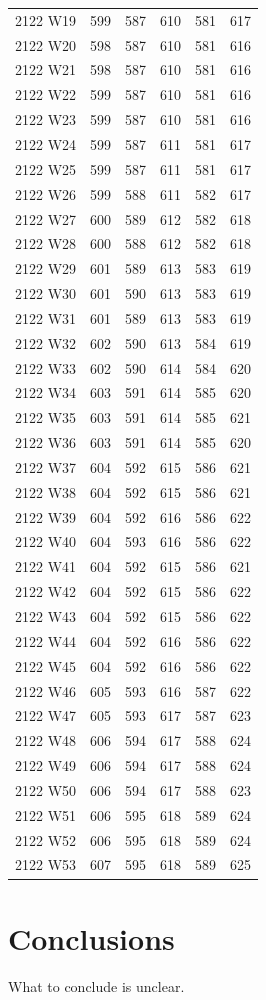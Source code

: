 \documentclass[AER]{AEA}
\begin{document}
\begin{longtable}[]{@{}lrrrrr@{}}
2122 W19 & 599 & 587 & 610 & 581 & 617 \\
2122 W20 & 598 & 587 & 610 & 581 & 616 \\
2122 W21 & 598 & 587 & 610 & 581 & 616 \\
2122 W22 & 599 & 587 & 610 & 581 & 616 \\
2122 W23 & 599 & 587 & 610 & 581 & 616 \\
2122 W24 & 599 & 587 & 611 & 581 & 617 \\
2122 W25 & 599 & 587 & 611 & 581 & 617 \\
2122 W26 & 599 & 588 & 611 & 582 & 617 \\
2122 W27 & 600 & 589 & 612 & 582 & 618 \\
2122 W28 & 600 & 588 & 612 & 582 & 618 \\
2122 W29 & 601 & 589 & 613 & 583 & 619 \\
2122 W30 & 601 & 590 & 613 & 583 & 619 \\
2122 W31 & 601 & 589 & 613 & 583 & 619 \\
2122 W32 & 602 & 590 & 613 & 584 & 619 \\
2122 W33 & 602 & 590 & 614 & 584 & 620 \\
2122 W34 & 603 & 591 & 614 & 585 & 620 \\
2122 W35 & 603 & 591 & 614 & 585 & 621 \\
2122 W36 & 603 & 591 & 614 & 585 & 620 \\
2122 W37 & 604 & 592 & 615 & 586 & 621 \\
2122 W38 & 604 & 592 & 615 & 586 & 621 \\
2122 W39 & 604 & 592 & 616 & 586 & 622 \\
2122 W40 & 604 & 593 & 616 & 586 & 622 \\
2122 W41 & 604 & 592 & 615 & 586 & 621 \\
2122 W42 & 604 & 592 & 615 & 586 & 622 \\
2122 W43 & 604 & 592 & 615 & 586 & 622 \\
2122 W44 & 604 & 592 & 616 & 586 & 622 \\
2122 W45 & 604 & 592 & 616 & 586 & 622 \\
2122 W46 & 605 & 593 & 616 & 587 & 622 \\
2122 W47 & 605 & 593 & 617 & 587 & 623 \\
2122 W48 & 606 & 594 & 617 & 588 & 624 \\
2122 W49 & 606 & 594 & 617 & 588 & 624 \\
2122 W50 & 606 & 594 & 617 & 588 & 623 \\
2122 W51 & 606 & 595 & 618 & 589 & 624 \\
2122 W52 & 606 & 595 & 618 & 589 & 624 \\
2122 W53 & 607 & 595 & 618 & 589 & 625 \\
\bottomrule()
\end{longtable}

\hypertarget{conclusions}{%
\section{Conclusions}\label{conclusions}}

What to conclude is unclear.
\end{document}
